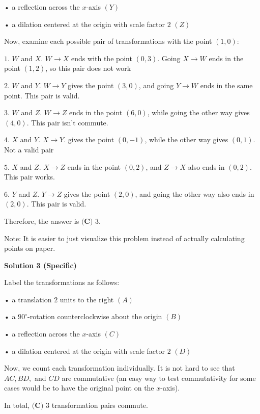 \begin{enumerate}
 • a reflection across the $x$-axis $(Y)$

 • a dilation centered at the origin with scale factor $2$ $(Z)$

 Now, examine each possible pair of transformations with the point $(1,0)$:

 $1.$ $W$ and $X$. $W\rightarrow X$ ends with the point $(0,3)$. Going $X\rightarrow W$ ends in the point $(1,2)$, so this pair does not work

 $2.$ $W$ and $Y$. $W\rightarrow Y$ gives the point $(3,0)$, and going $Y\rightarrow W$ ends in the same point. This pair is valid.

 $3.$ $W$ and $Z$. $W\rightarrow Z$ ends in the point $(6,0)$, while going the other way gives $(4,0)$. This pair isn't commute.

 $4.$ $X$ and $Y$. $X\rightarrow Y$. gives the point $(0,-1)$, while the other way gives $(0,1)$. Not a valid pair

 $5.$ $X$ and $Z$. $X\rightarrow Z$ ends in the point $(0,2)$, and $Z\rightarrow X$ also ends in $(0,2)$. This pair works.

 $6.$ $Y$ and $Z$. $Y\rightarrow Z$ gives the point $(2,0)$, and going the other way also ends in $(2,0)$. This pair is valid.

 Therefore, the answer is $\boxed{\textbf{(C) }3}$.

 Note: It is easier to just visualize this problem instead of actually calculating points on paper.

 



\textbf{Solution 3 (Specific)}

Label the transformations as follows:

 • a translation $2$ units to the right $(A)$

 • a $90^{\circ}$-rotation counterclockwise about the origin $(B)$

 • a reflection across the $x$-axis $(C)$

 • a dilation centered at the origin with scale factor $2$ $(D)$

 Now, we count each transformation individually. It is not hard to see that $AC, BD,$ and $CD$ are commutative (an easy way to test commutativity for some cases would be to have the original point on the $x$-axis). 

 In total, $\boxed{\textbf{(C) }3}$ transformation pairs commute.

 




\end{enumerate}

